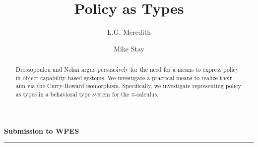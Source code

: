 \documentclass[]{amsart}
\theoremstyle{definition}
\theoremstyle{remark}
\numberwithin{equation}{subsection}
\newcommand{\pic}{$\pi$-calculus}
\newcommand{\papertitle}{Policy as Types}
\begin{document}
\lstset{language=erlang}

\setlength{\topmargin}{0in}
\setlength{\textheight}{8.5in}
\setlength{\parskip}{6pt}

\title{\papertitle}

\author{ L.G. Meredith }
\author{ Mike Stay }







\dedicatory{}



\begin{abstract}
\normalsize{ 

  Drossopoulou and Nolan argue persuasively for the need for a means
  to express policy in object-capability-based systems. We investigate
  a practical means to realize their aim via the Curry-Howard
  isomorphism. Specifically, we investigate representing policy as
  types in a behavioral type system for the \pic.

}

\end{abstract}

\noindent
{\large \textbf{Submission to WPES}}\\
\rule{6.25in}{0.75pt}\\\\\\

\maketitle
\end{document}
